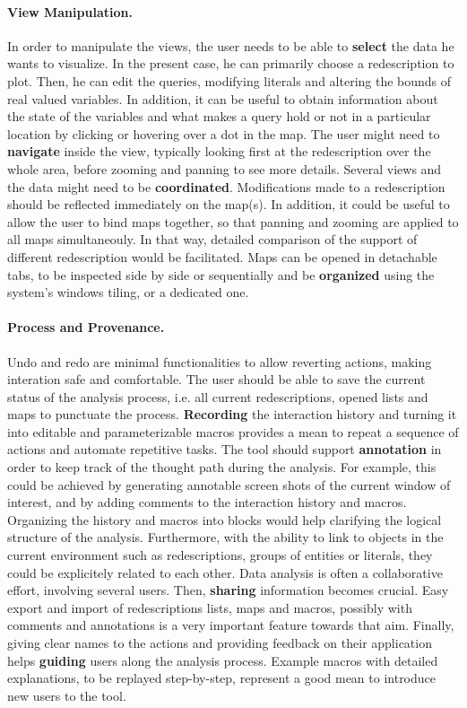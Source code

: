 \documentclass{llncs}
\begin{document}
\paragraph{View Manipulation.}
In order to manipulate the views, the user needs to be able to
\textbf{select} the data he wants to visualize. In the present case,
he can primarily choose a redescription to plot. Then, he can edit the
queries, modifying literals and altering the bounds of real valued
variables. In addition, it can be useful to obtain information about
the state of the variables and what makes a query hold or not in a
particular location by clicking or hovering over a dot in the map.
The user might need to \textbf{navigate} inside the view, typically
looking first at the redescription over the whole area, before zooming
and panning to see more details. Several views and the data might need
to be \textbf{coordinated}.  Modifications made to a redescription
should be reflected immediately on the map(s). In addition, it could
be useful to allow the user to bind maps together, so that panning and
zooming are applied to all maps simultaneouly. In that way, detailed
comparison of the support of different redescription would be
facilitated.  Maps can be opened in detachable tabs, to be inspected
side by side or sequentially and be \textbf{organized} using the
system's windows tiling, or a dedicated one.

\paragraph{Process and Provenance.}
Undo and redo are minimal functionalities to allow reverting actions,
making interation safe and comfortable.  The user should be able to
save the current status of the analysis process, i.e. all current
redescriptions, opened lists and maps to punctuate the
process. \textbf{Recording} the interaction history and turning it
into editable and parameterizable macros provides a mean to repeat a
sequence of actions and automate repetitive tasks.  The tool should
support \textbf{annotation} in order to keep track of the thought path
during the analysis.  For example, this could be achieved by
generating annotable screen shots of the current window of interest,
and by adding comments to the interaction history and macros.
Organizing the history and macros into blocks would help clarifying
the logical structure of the analysis.  Furthermore, with the ability
to link to objects in the current environment such as redescriptions,
groups of entities or literals, they could be explicitely related to
each other.  Data analysis is often a collaborative effort, involving
several users. Then, \textbf{sharing} information becomes crucial.
Easy export and import of redescriptions lists, maps and macros,
possibly with comments and annotations is a very important feature
towards that aim.  Finally, giving clear names to the actions and
providing feedback on their application helps \textbf{guiding} users
along the analysis process. Example macros with detailed explanations,
to be replayed step-by-step, represent a good mean to introduce new
users to the tool.
\end{document}

